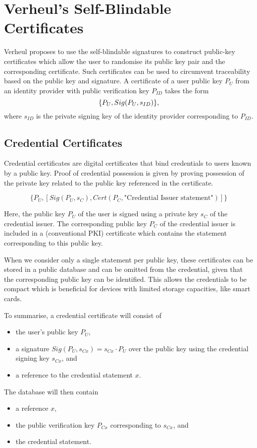 \section{Verheul's Self-Blindable Certificates}

Verheul proposes to use the self-blindable signatures to construct public-key
certificates which allow the user to randomise its public key pair and the
corresponding certificate. Such certificates can be used to circumvent
traceability based on the public key and signature. A certificate of a user
public key $P_U$ from an identity provider with public verification key $P_{ID}$
takes the form
\begin{equation}\label{eqn:SB-certificate}
  \{ P_U, Sig(P_U, s_{ID}) \}\text,
\end{equation}
where $s_{ID}$ is the private signing key of the identity provider corresponding
to $P_{ID}$.

\subsection{Credential Certificates}

Credential certificates are digital certificates that bind credentials to users
known by a public key. Proof of credential possession is given by proving
possession of the private key related to the public key referenced in the
certificate.

$$\{P_U, [Sig(P_U, s_C), Cert(P_C, \text{"Credential Issuer statement"})]\}$$

Here, the public key $P_U$ of the user is signed using a private key $s_C$ of
the credential issuer. The corresponding public key $P_C$ of the credential
issuer is included in a (conventional PKI) certificate which contains the
statement corresponding to this public key.

When we consider only a single statement per public key, these certificates can
be stored in a public database and can be omitted from the credential, given
that the corresponding public key can be identified. This allows the credentials
to be compact which is beneficial for devices with limited storage capacities,
like smart cards.

To summarise, a credential certificate will consist of
\begin{itemize}
  \item the user's public key $P_U$,
  \item a signature $Sig(P_U, s_{Cx}) = s_{Cx} \cdot P_U$ over the public key
    using the credential signing key $s_{Cx}$, and
  \item a reference to the credential statement $x$.
\end{itemize}
The database will then contain
\begin{itemize}
  \item a reference $x$,
  \item the public verification key $P_{Cx}$ corresponding to $s_{Cx}$, and
  \item the credential statement.
\end{itemize}

